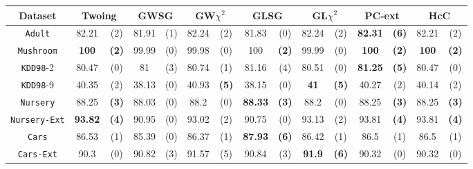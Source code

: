 \begin{sidewaystable*}[ph!]
\centering
\begin{tabular}{c|cc|cc|cc|cc|cc|cc|cc} 
Dataset & \multicolumn{2}{c|}{Twoing} &  \multicolumn{2}{c|}{GWSG}  
&   \multicolumn{2}{c|}{GW$\chi^2$}                   &\multicolumn{2}{c|}{GLSG}       &\multicolumn{2}{c|}{GL$\chi^2$} & \multicolumn{2}{c|}{PC-ext} & \multicolumn{2}{c}{HcC}\\  \hline 
{\tt Adult}         & 82.21    & (2)    & 81.91    & (1)    & 82.24    & (2)    & 81.83    & (0)    & 82.24    & (2)    &{\bf82.31}&{\bf(6)}          & 82.21    & (2)      \\
{\tt Mushroom}      & {\bf 100}&{\bf(2)}& 99.99    & (0)    & 99.98    & (0)    & 100      &{\bf(2)}& 99.99    & (0)    &{\bf 100} &{\bf(2)}          &{\bf100}  & {\bf(2)} \\
{\tt KDD98}-2       & 80.47    & (0)    & 81       & (3)    & 80.74    & (1)    & 81.16    & (4)    & 80.51    & (0)    &{\bf81.25}&{\bf(5)}          & 80.47    & (0)      \\
{\tt KDD98}-9       & 40.35    & (2)    & 38.13    & (0)    & 40.93    &{\bf(5)}& 38.15    & (0)    &{\bf 41 } &{\bf(5)}& 40.27    & (2)              & 40.14    & (2)      \\
{\tt Nursery}       & 88.25    &{\bf(3)}& 88.03    & (0)    & 88.2     & (0)    &{\bf88.33}&{\bf(3)}& 88.2     & (0)    & 88.25    &{\bf(3)}          & 88.25    & {\bf(3)} \\
{\tt Nursery-Ext}   &{\bf93.82}&{\bf(4)}& 90.95    & (0)    & 93.02    & (2)    & 90.75    & (0)    & 93.13    & (2)    & 93.81    &{\bf(4)}          & 93.81    & {\bf(4)} \\
{\tt Cars}          & 86.53    & (1)    & 85.39    & (0)    & 86.37    & (1)    &{\bf87.93}&{\bf(6)}& 86.42    & (1)    & 86.5     & (1)              & 86.5     & (1)      \\
{\tt Cars-Ext}      & 90.3     & (0)    & 90.82    & (3)    & 91.57    & (5)    & 90.84    & (3)    &{\bf 91.9}&{\bf(6)}& 90.32    & (0)              & 90.32    & (0)      \\

\end{tabular}
\end{sidewaystable*}
